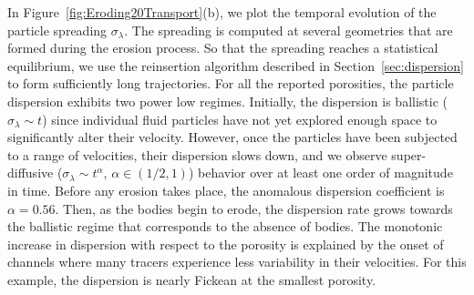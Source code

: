 \documentclass[preprint,10pt]{elsarticle}
\begin{document}
In Figure~\ref{fig:Eroding20Transport}(b), we plot the temporal
evolution of the particle spreading $\sigma_\lambda$.  The spreading is
computed at several geometries that are formed during the erosion
process.  So that the spreading reaches a statistical equilibrium, we
use the reinsertion algorithm described in Section~\ref{sec:dispersion}
to form sufficiently long trajectories.  For all the reported
porosities, the particle dispersion exhibits two power low regimes.
Initially, the dispersion is ballistic ($\sigma_\lambda \sim t$) since
individual fluid particles have not yet explored enough space to
significantly alter their velocity.  However, once the particles have
been subjected to a range of velocities, their dispersion slows down,
and we observe super-diffusive ($\sigma_\lambda \sim t^\alpha$, $\alpha
\in (1/2,1)$) behavior over at least one order of magnitude in time.
Before any erosion takes place, the anomalous dispersion coefficient is
$\alpha = 0.56$.  Then, as the bodies begin to erode, the dispersion
rate grows towards the ballistic regime that corresponds to the absence
of bodies.  The monotonic increase in dispersion with respect to the
porosity is explained by the onset of channels where many tracers
experience less variability in their velocities.  For this example, the
dispersion is nearly Fickean at the smallest porosity.
\end{document}
